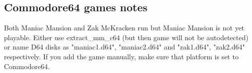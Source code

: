 \subsection{Commodore64 games notes}
Both Maniac Mansion and Zak McKracken run but Maniac Mansion is not yet
playable. Either use extract\_mm\_c64 (but then game will not be autodetected)
or name D64 disks as "maniac1.d64", "maniac2.d64" and "zak1.d64", "zak2.d64"
respectively. If you add the game manually, make sure that platform is set to
Commodore64.
